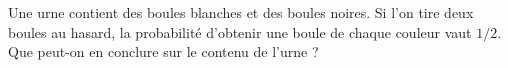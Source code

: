 Une urne contient des boules blanches et des boules noires. Si l'on tire deux boules au hasard, la probabilité d'obtenir une boule de chaque couleur vaut $1/2$. Que peut-on en conclure sur le contenu de l'urne ?
